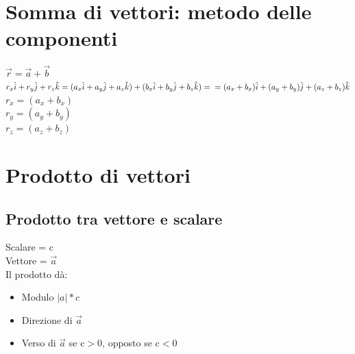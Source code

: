 \documentclass{report}
\begin{document}
\section{Somma di vettori: metodo delle componenti}
$\vec{r}=\vec{a}+\vec{b}$\\
$r_x\hat{i}+r_y\hat{j}+r_z\hat{k}=(a_x\hat{i}+a_y\hat{j}+a_z\hat{k})+(b_x\hat{i}+b_y\hat{j}+b_z\hat{k})=\\=(a_x+b_x)\hat{i}+(a_y+b_y)\hat{j}+(a_z+b_z)\hat{k}$\\
$r_x=(a_x+b_x)$\\
$r_y=(a_y+b_y)$\\
$r_z=(a_z+b_z)$\\
\section{Prodotto di vettori}
\subsection{Prodotto tra vettore e scalare}
Scalare = c\\
Vettore = $\vec{a}$\\
Il prodotto dà:
\begin{itemize}
  \item Modulo $|a|*c$
  \item Direzione di $\vec{a}$
  \item Verso di $\vec{a}$ se c$>$0, opposto se c$<$0
\end{itemize}
\end{document}
